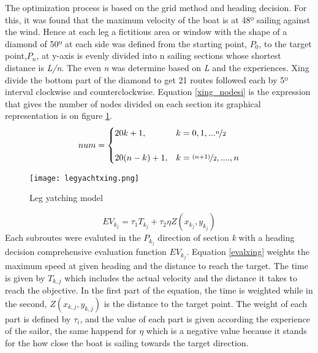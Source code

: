 The optimization process is based on the grid method and heading decision. For this, it was found that the maximum velocity of the boat is at 48º sailing against the wind. Hence at each leg  a fictitious area or window with the shape of a diamond of 50º at each side was defined from the starting point, $P_{0}$, to the target point,$P_{n}$, at y-axis is evenly divided into n sailing sections whose shortest distance is \textit{L/n}. The even \textit{n} was determine based on \textit{L} and the experiences. Xing divide the bottom part of the diamond to get 21 routes followed each by 5º interval clockwise and counterclockwise. Equation \ref{xing_nodesi} is the expression that gives the number of nodes divided on each section its graphical representation is on figure \ref{xing_fignodesi}. 
\begin{equation}
\label{xing_nodesi}
num=
\begin{cases}
20k+1,  & k=0,1,...\nicefrac{n}{2} \\
\\
\noindent 
\displaystyle
20(n-k)+1, & k=\nicefrac{(n+1)}{2}, .... ,n\\
\end{cases}
\end{equation}
\begin{figure}[hbt!]
\centering
  \texttt{[image: legyachtxing.png]}
 \caption{Leg yatching model \cite{xing2012path} }
\label{xing_fignodesi}
\end{figure}
\begin{equation}\label{evalxing}
EV_{k_j}=\tau_{1}T_{k_j}+\tau_{2}\eta Z(x_{k_j},y_{k_j})
\end{equation}
Each subroutes were evaluted in the $P_{k_j}$ direction of section \textit{k} with a heading decision comprehensive evaluation function $EV_{k_j}$.  Equation  \ref{evalxing}  weights the maximum speed at given heading and the distance to reach the target.
The time is given by $T_{k,j}$  which includes the actual velocity and the distance it takes to reach the objective. In the first part of the equation, the time is weighted while in the second,   $Z(x_{k,j},y_{k,j})$  is the distance to the target point. The weight of each part is defined by $\tau_{i}$, and the value of each part is given according the experience of the sailor, the same happend for $\eta$ which is a negative value because it stands for the how close the boat is sailing towards the target direction.\\
